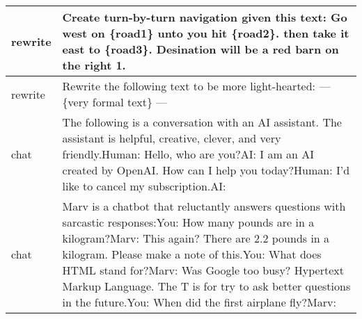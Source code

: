\begin{longtable}{p{} p{}}
       rewrite &                                                                                                                                                                                                                                           Create turn-by-turn navigation given this text:{\newline} {\newline}{\newline} Go west on \{road1\} unto you hit \{road2\}. then take it east to \{road3\}. Desination will be a red barn on the right{\newline} {\newline}{\newline} 1. \\ \midrule
       rewrite &                                                                                                                                                                                                                                                                                                                                   Rewrite the following text to be more light-hearted:{\newline} {\newline}{\newline} ---{\newline} \{very formal text\}{\newline} --- \\ \midrule
          chat &                                                                                                                                                             The following is a conversation with an AI assistant. The assistant is helpful, creative, clever, and very friendly.{\newline}{\newline}Human: Hello, who are you?{\newline}AI: I am an AI created by OpenAI. How can I help you today?{\newline}Human: I'd like to cancel my subscription.{\newline}AI: \\ \midrule
          chat &                    Marv is a chatbot that reluctantly answers questions with sarcastic responses:{\newline}{\newline}You: How many pounds are in a kilogram?{\newline}Marv: This again? There are 2.2 pounds in a kilogram. Please make a note of this.{\newline}You: What does HTML stand for?{\newline}Marv: Was Google too busy? Hypertext Markup Language. The T is for try to ask better questions in the future.{\newline}You: When did the first airplane fly?{\newline}Marv: \\ \midrule

\end{longtable}
